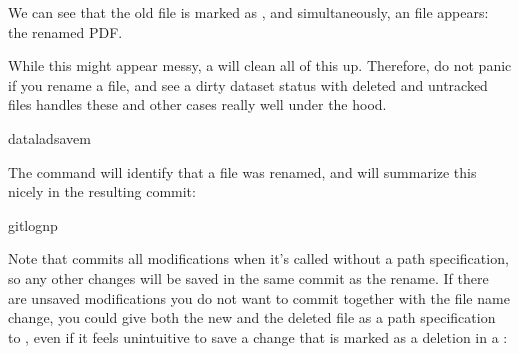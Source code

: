 \sphinxAtStartPar
We can see that the old file is marked as , and
simultaneously, an  file appears: the renamed
PDF.

\sphinxAtStartPar
While this might appear messy, a  will clean
all of this up. Therefore, do not panic if you rename a file,
and see a dirty dataset status with deleted and untracked files
\textendash{}  handles these and other cases really well
under the hood.

\newpage

\begin{sphinxVerbatim}[commandchars=\\\{\}]
dataladsave\PYGZhy{}m
\end{sphinxVerbatim}

\sphinxAtStartPar
The  command will identify that a file was
renamed, and will summarize this nicely in the resulting commit:

%
\begin{sphinxVerbatim}[commandchars=\\\{\}]
gitlog\PYGZhy{}n\PYGZhy{}p


\end{sphinxVerbatim}
\sphinxresetverbatimhllines

\sphinxAtStartPar
Note that  commits all modifications when
it’s called without a path specification,
so any other changes will be saved in the same commit as the rename.
If there are unsaved modifications you do not want to commit
together with the file name change, you could give both the
new and the deleted file as a path specification to
, even if it feels unintuitive to
save a change that is marked as a deletion in a
:

